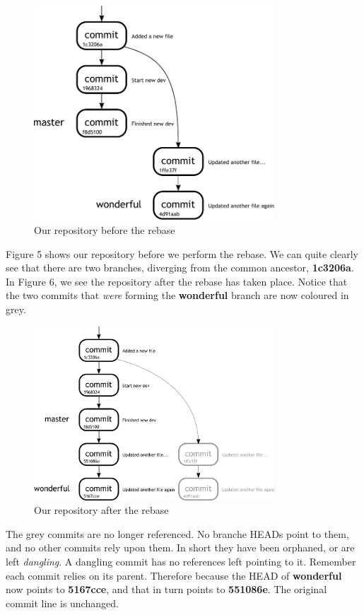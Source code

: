 \begin{figure}[hbt]
\centering
\includegraphics[width=9cm]{images/f-w7-d5.pdf}
\caption{Our repository before the rebase}
\end{figure}

Figure 5 shows our repository before we perform the rebase.
We can quite clearly see that there are two branches, diverging from the common ancestor, \textbf{1c3206a}.
In Figure 6, we see the repository after the rebase has taken place.
Notice that the two commits that \emph{were} forming the \textbf{wonderful} branch are now coloured in grey.

\begin{figure}[hbt]
\centering
\includegraphics[width=9cm]{images/f-w7-d6.pdf}
\caption{Our repository after the rebase}
\end{figure}

The grey commits are no longer referenced.
No branche HEADs point to them, and no other commits rely upon them.
In short they have been orphaned, or are left \emph{dangling}.
A dangling commit has no references left pointing to it.
Remember each commit relies on its parent.
Therefore because the HEAD of \textbf{wonderful} now points to \textbf{5167cce}, and that in turn points to \textbf{551086e}.
The original commit line is unchanged.


